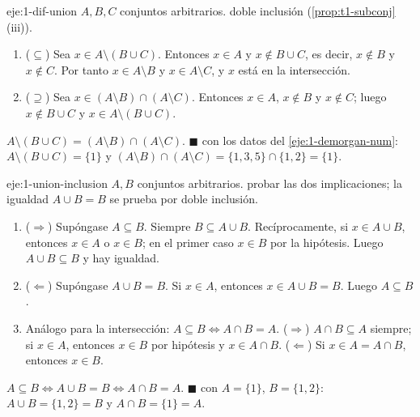 \begin{solucion}{eje:1-dif-union}
\datos $A,B,C$ conjuntos arbitrarios.
\planteamiento doble inclusión (\cref{prop:t1-subconj}(iii)).
\pasos
\begin{enumerate}[label=\arabic*.]
  \item ($\subseteq$) Sea $x\in A\setminus(B\cup C)$. Entonces $x\in A$ y $x\notin B\cup C$, es decir, $x\notin B$ y $x\notin C$. Por tanto $x\in A\setminus B$ y $x\in A\setminus C$, y $x$ está en la intersección.
  \item ($\supseteq$) Sea $x\in(A\setminus B)\cap(A\setminus C)$. Entonces $x\in A$, $x\notin B$ y $x\notin C$; luego $x\notin B\cup C$ y $x\in A\setminus(B\cup C)$.
\end{enumerate}
\resultado $A\setminus(B\cup C)=(A\setminus B)\cap(A\setminus C)$. \hfill$\blacksquare$
\comprobacion con los datos del \cref{eje:1-demorgan-num}: $A\setminus(B\cup C)=\{1\}$ y $(A\setminus B)\cap(A\setminus C)=\{1,3,5\}\cap\{1,2\}=\{1\}$.
\end{solucion}

\begin{solucion}{eje:1-union-inclusion}
\datos $A,B$ conjuntos arbitrarios.
\planteamiento probar las dos implicaciones; la igualdad $A\cup B=B$ se prueba por doble inclusión.
\pasos
\begin{enumerate}[label=\arabic*.]
  \item ($\Rightarrow$) Supóngase $A\subseteq B$. Siempre $B\subseteq A\cup B$. Recíprocamente, si $x\in A\cup B$, entonces $x\in A$ o $x\in B$; en el primer caso $x\in B$ por la hipótesis. Luego $A\cup B\subseteq B$ y hay igualdad.
  \item ($\Leftarrow$) Supóngase $A\cup B=B$. Si $x\in A$, entonces $x\in A\cup B=B$. Luego $A\subseteq B$.
  \item Análogo para la intersección: $A\subseteq B\iff A\cap B=A$. ($\Rightarrow$) $A\cap B\subseteq A$ siempre; si $x\in A$, entonces $x\in B$ por hipótesis y $x\in A\cap B$. ($\Leftarrow$) Si $x\in A=A\cap B$, entonces $x\in B$.
\end{enumerate}
\resultado $A\subseteq B\iff A\cup B=B\iff A\cap B=A$. \hfill$\blacksquare$
\comprobacion con $A=\{1\}$, $B=\{1,2\}$: $A\cup B=\{1,2\}=B$ y $A\cap B=\{1\}=A$.
\end{solucion}

